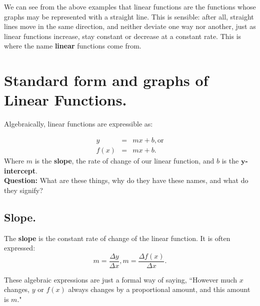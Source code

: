 We can see from the above examples that linear functions are the functions whose graphs may be represented with a straight line.  This is sensible: after all, straight lines move in the same direction, and neither deviate one way nor another, just as linear functions increase, stay constant or decrease at a constant rate.  This is where the name \textbf{linear} functions come from.\\


\section{Standard form and graphs of Linear Functions.}\label{Section:GraphsofLinearFunctions}

Algebraically, linear functions are expressible as:

\begin{eqnarray*}
y&=&mx+b, \text{or}\\
f(x)&=&mx+b.
\end{eqnarray*}
%
Where $m$ is the \textbf{slope}, the rate of change of our linear function, and $b$ is the $\mathbf{y}$\textbf{-intercept}.\\



\textbf{Question:} What are these things, why do they have these names, and what do they signify?\\


\subsection{Slope.}


The \textbf{slope} is the constant rate of change of the linear function.  It is often expressed: $$m=\frac{\Delta y}{\Delta x}, m=\frac{\Delta f(x)}{\Delta x}.$$

These algebraic expressions are just a formal way of saying, ``However much $x$ changes, $y$ or $f(x)$ always changes by a proportional amount, and this amount is $m$."


